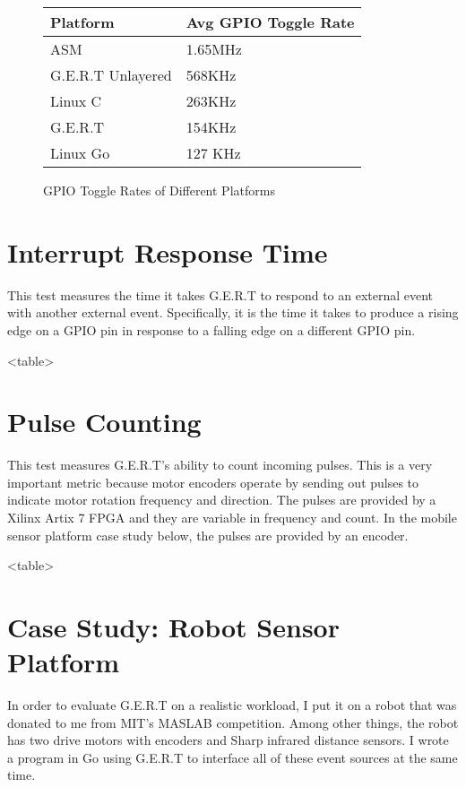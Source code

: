 \begin{figure} [h]
\begin{center}
  \begin{tabular}{ | l | l |}
    \hline
    Platform & Avg GPIO Toggle Rate \\ \hline
    ASM & 1.65MHz \\ \hline
    G.E.R.T Unlayered & 568KHz \\ \hline
    Linux C & 263KHz \\ \hline
    G.E.R.T & 154KHz \\ \hline
    Linux Go & 127 KHz \\
    \hline
  \end{tabular}
\end{center}
  \caption{GPIO Toggle Rates of Different Platforms}  \label{fig:toggle}
\end{figure}


\section{Interrupt Response Time}
This test measures the time it takes G.E.R.T to respond to an external event
with another external event. Specifically, it is the time it takes to produce
a rising edge on a GPIO pin in response to a falling edge on a different GPIO pin.

<table>

\section{Pulse Counting}
This test measures G.E.R.T's ability to count incoming pulses. This is a very
important metric because motor encoders operate by sending out pulses to indicate
motor rotation frequency and direction. The pulses are provided by a Xilinx Artix 7
FPGA and they are variable in frequency and count. In the mobile sensor platform
case study below, the pulses are provided by an encoder.

<table>


\section{Case Study: Robot Sensor Platform}
In order to evaluate G.E.R.T on a realistic workload, I put it on a robot that was
donated to me from MIT's MASLAB competition. Among other things, the robot has two drive
motors with encoders and Sharp infrared distance sensors. I wrote a program in Go using
G.E.R.T to interface all of these event sources at the same time.

